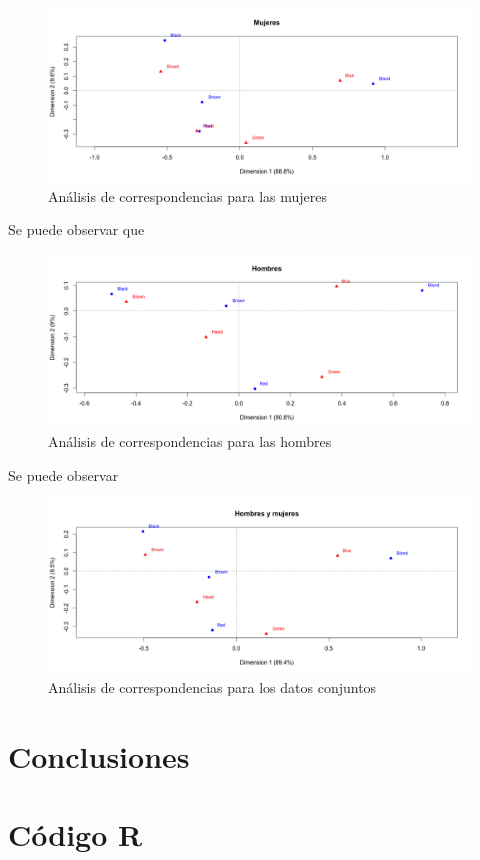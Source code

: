 \documentclass[12pt,a4paper,twoside,openright,titlepage,final]{article}
\begin{document}
\begin{figure}[tbph!]
\centering
\includegraphics[width=\linewidth]{imagenes/mujeres_ca}
\caption{Análisis de correspondencias para las mujeres}
\label{fig:mujeres_ca}
\end{figure}

Se puede observar que 

\begin{figure}[tbph!]
\centering
\includegraphics[width=\linewidth]{imagenes/hombres_ca}
\caption{Análisis de correspondencias para las hombres}
\label{fig:hombres_ca}
\end{figure}

Se puede observar

\begin{figure}[tbph!]
\centering
\includegraphics[width=\linewidth]{imagenes/global_ca}
\caption{Análisis de correspondencias para los datos conjuntos}
\label{fig:global_ca}
\end{figure}
\section{Conclusiones}

\section{Código R}
\end{document}
